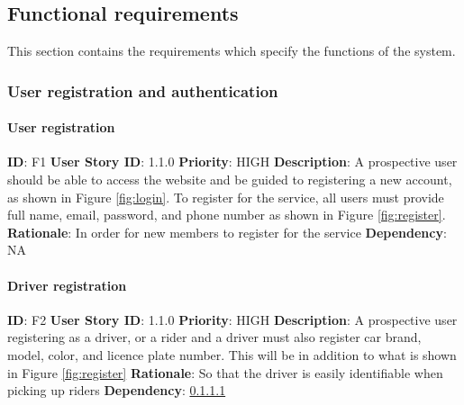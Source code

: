 \documentclass{article}
\begin{document}

\subsection{Functional requirements}
This section contains the requirements which specify the functions of the system.


\subsubsection{User registration and authentication}

\paragraph{User registration}\label{req:registration}
\textbf{ID}: F1\newline
\textbf{User Story ID}: 1.1.0\newline
\textbf{Priority}: HIGH\newline
\textbf{Description}: A prospective user should be able to access the website and be guided to registering a new account, as shown in Figure \ref{fig:login}. To register for the service, all users must provide full name, email, password, and phone number as shown in Figure \ref{fig:register}.\newline
\textbf{Rationale}: In order for new members to register for the service\newline
\textbf{Dependency}: NA

\paragraph{Driver registration}\label{req:driverRegistration}
\textbf{ID}: F2\newline
\textbf{User Story ID}: 1.1.0\newline
\textbf{Priority}: HIGH\newline
\textbf{Description}: A prospective user registering as a driver, or a rider and a driver must also register car brand, model, color, and licence plate number. This will be in addition to what is shown in Figure \ref{fig:register}\newline
\textbf{Rationale}: So that the driver is easily identifiable when picking up riders\newline
\textbf{Dependency}: \ref{req:registration}\newline
\end{document}
